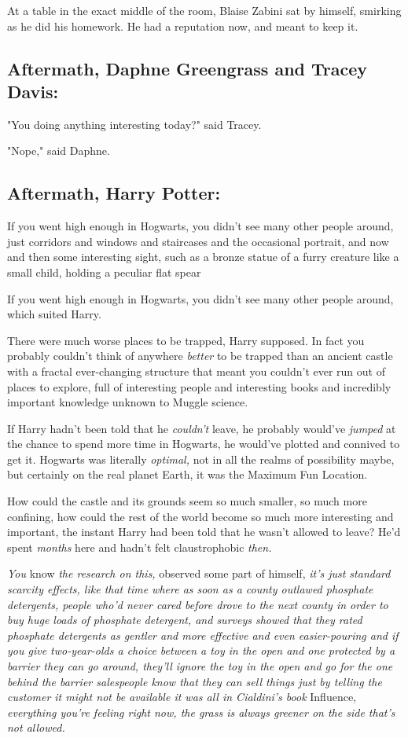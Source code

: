 At a table in the exact middle of the room, Blaise Zabini sat by himself,
smirking as he did his homework. He had a reputation now, and meant to keep it.
\sbreak
\subsection{Aftermath, Daphne Greengrass and Tracey Davis:}

"You doing anything interesting today?" said Tracey.

"Nope," said Daphne.
\sbreak
\subsection{Aftermath, Harry Potter:}

If you went high enough in Hogwarts, you didn't see many other people around,
just corridors and windows and staircases and the occasional portrait, and now
and then some interesting sight, such as a bronze statue of a furry creature
like a small child, holding a peculiar flat spear{\el}

If you went high enough in Hogwarts, you didn't see many other people around,
which suited Harry.

There were much worse places to be trapped, Harry supposed. In fact you
probably couldn't think of anywhere \emph{better} to be trapped than an ancient
castle with a fractal ever-changing structure that meant you couldn't ever run
out of places to explore, full of interesting people and interesting books and
incredibly important knowledge unknown to Muggle science.

If Harry hadn't been told that he \emph{couldn't} leave, he probably would've
\emph{jumped} at the chance to spend more time in Hogwarts, he would've plotted
and connived to get it. Hogwarts was literally \emph{optimal,} not in all the
realms of possibility maybe, but certainly on the real planet Earth, it was the
Maximum Fun Location.

How could the castle and its grounds seem so much smaller, so much more
confining, how could the rest of the world become so much more interesting and
important, the instant Harry had been told that he wasn't allowed to leave?
He'd spent \emph{months} here and hadn't felt claustrophobic \emph{then.}

\emph{You} know \emph{the research on this,} observed some part of himself,
\emph{it's just standard scarcity effects, like that time where as soon as a
county outlawed phosphate detergents, people who'd never cared before drove to
the next county in order to buy huge loads of phosphate detergent, and surveys
showed that they rated phosphate detergents as gentler and more effective and
even easier-pouring{\el} and if you give two-year-olds a choice between a
toy in the open and one protected by a barrier they can go around, they'll
ignore the toy in the open and go for the one behind the barrier{\el}
salespeople know that they can sell things just by telling the customer it
might not be available{\el} it was all in Cialdini's book} Influence,
\emph{everything you're feeling right now, the grass is always greener on the side
that's not allowed.}

